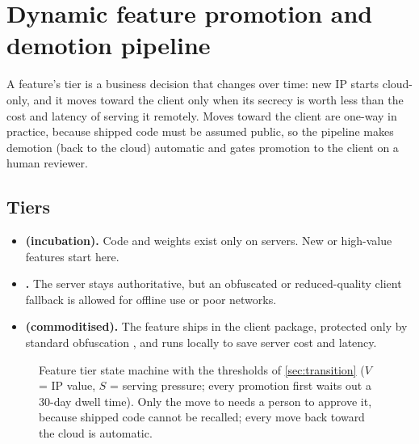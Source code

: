\section{Dynamic feature promotion and demotion pipeline}\label{sec:lifecycle}

A feature's tier is a business decision that changes over time: new IP starts cloud-only,
and it moves toward the client only when its secrecy is worth less than the cost and latency
of serving it remotely. Moves toward the client are one-way in practice, because shipped
code must be assumed public, so the pipeline makes demotion (back to the cloud) automatic
and gates promotion to the client on a human reviewer.

\subsection{Tiers}
\begin{itemize}
  \item \textbf{ (incubation).} Code and weights exist only on servers.
        New or high-value features start here.
  \item \textbf{.} The server stays authoritative, but an obfuscated or
        reduced-quality client fallback is allowed for offline use or poor networks.
  \item \textbf{ (commoditised).} The feature ships in the client package,
        protected only by standard obfuscation \cite{collberg1997taxonomy}, and runs locally
        to save server cost and latency.
\end{itemize}

\begin{figure}[htbp]
\centering

\caption{Feature tier state machine with the thresholds of \cref{sec:transition}
(\(V\) = IP value, \(S\) = serving pressure; every promotion first waits out a 30-day dwell
time). Only the move to  needs a person to approve it, because shipped code
cannot be recalled; every move back toward the cloud is automatic.}
\label{fig:lifecycle}
\end{figure}

